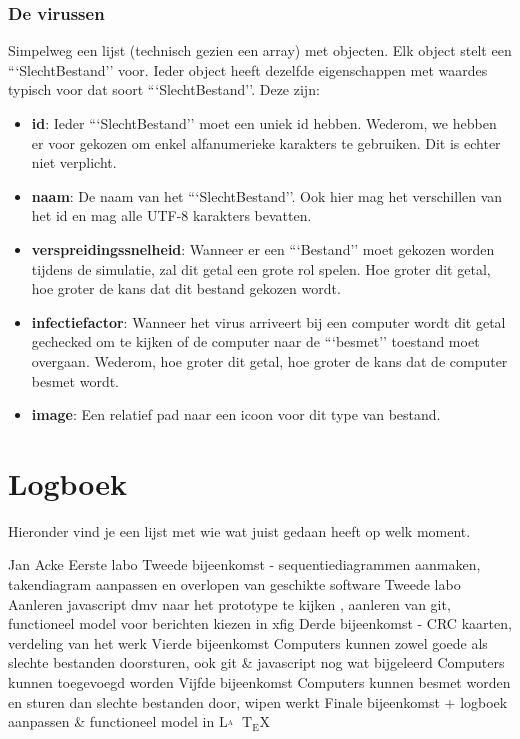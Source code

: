 \documentclass[a4paper,oneside]{report}
\def\latex{$\mathrm{L\!\!^{{}_{\scriptstyle A}} \!\!\!\!\!\;\; T\!_{\displaystyle E} \!
X}$}
\begin{document}
\subsection{De virussen}
Simpelweg een lijst (technisch gezien een array) met objecten. Elk object stelt een ```SlechtBestand'' voor.
Ieder object heeft dezelfde eigenschappen met waardes typisch voor dat soort ```SlechtBestand''.
Deze zijn:
\begin{itemize}
    \item \textbf{id}: Ieder ```SlechtBestand'' moet een uniek id hebben. Wederom, we hebben er voor gekozen om enkel alfanumerieke karakters te gebruiken. Dit is echter niet verplicht.
    \item \textbf{naam}: De naam van het ```SlechtBestand''. Ook hier mag het verschillen van het id en mag alle UTF-8 karakters bevatten.
    \item \textbf{verspreidingssnelheid}: Wanneer er een ```Bestand'' moet gekozen worden tijdens de simulatie, zal dit getal een grote rol spelen.
    		Hoe groter dit getal, hoe groter de kans dat dit bestand gekozen wordt.
    \item \textbf{infectiefactor}: Wanneer het virus arriveert bij een computer wordt dit getal gechecked om te kijken of de computer naar de ```besmet'' toestand moet overgaan.
    		Wederom, hoe groter dit getal, hoe groter de kans dat de computer besmet wordt.
    \item \textbf{image}: Een relatief pad naar een icoon voor dit type van bestand.
\end{itemize}



\chapter{Logboek}
Hieronder vind je een lijst met wie wat juist gedaan heeft op welk moment.
\begin{studentlog}{Jan Acke}
{Eerste labo}
{Tweede bijeenkomst - sequentiediagrammen aanmaken, takendiagram aanpassen en overlopen van geschikte software}
{Tweede labo}
{Aanleren javascript dmv naar het prototype te kijken , aanleren van git, functioneel model voor berichten kiezen in xfig}
{Derde bijeenkomst - CRC kaarten, verdeling van het werk}
{Vierde bijeenkomst}
{Computers kunnen zowel goede als slechte bestanden doorsturen, ook git \& javascript nog wat bijgeleerd}
{Computers kunnen toegevoegd worden}
{Vijfde bijeenkomst}
{Computers kunnen besmet worden en sturen dan slechte bestanden door, wipen werkt}
{Finale bijeenkomst + logboek aanpassen \& functioneel model in \latex}
\end{studentlog}
\end{document}
